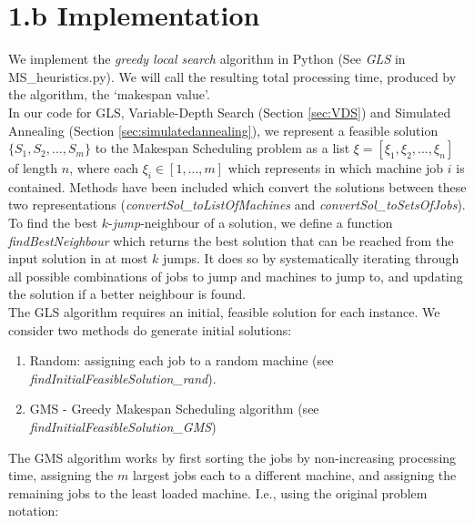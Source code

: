 \documentclass[12pt,a4paper,reqno]{article}
\begin{document}
\section*{1.b Implementation} \label{sec:implementation}
We implement the \textit{greedy local search} algorithm in Python (See \emph{GLS} in MS\_heuristics.py). We will call the resulting total processing time, produced by the algorithm, the `makespan value'. \\

In our code for GLS, Variable-Depth Search (Section \ref{sec:VDS}) and Simulated Annealing (Section \ref{sec:simulatedannealing}), we represent a feasible solution $\{S_1,S_2,...,S_m\}$ to the Makespan Scheduling problem as a list $\xi = [\xi_1,\xi_2,...,\xi_n]$ of length $n$, where each $\xi_i \in [1,...,m]$ which represents in which machine job $i$ is contained. Methods have been included which convert the solutions between these two representations (\textit{convertSol\_toListOfMachines} and \textit{convertSol\_toSetsOfJobs}). \\

To find the best $k$-\emph{jump}-neighbour of a solution, we define a function \emph{findBestNeighbour} which returns the best solution that can be reached from the input solution in at most $k$ jumps. It does so by systematically iterating through all possible combinations of jobs to jump and machines to jump to, and updating the solution if a better neighbour is found.\\

The GLS algorithm requires an initial, feasible solution for each instance. We consider two methods do generate initial solutions:
\begin{enumerate}
\item Random: assigning each job to a random machine (see \emph{findInitialFeasibleSolution\_rand}).
\item GMS - Greedy Makespan Scheduling algorithm (see \emph{findInitialFeasibleSolution\_GMS})
\end{enumerate}

The GMS algorithm works by first sorting the jobs by non-increasing processing time, assigning the $m$ largest jobs each to a different machine, and assigning the remaining jobs to the least loaded machine. I.e., using the original problem notation:
\end{document}
